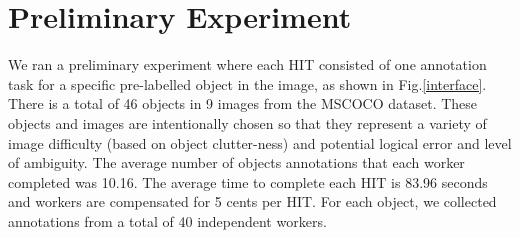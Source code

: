 \documentclass[12pt]{article}
\begin{document}
\section{Preliminary Experiment}
We ran a preliminary experiment where each HIT consisted of one annotation task for a specific pre-labelled object in the image, as shown in Fig.\ref{interface}. There is a total of 46 objects in 9 images from the MSCOCO dataset\cite{Lin2014}. These objects and images are intentionally chosen so that they represent a variety of image difficulty (based on object clutter-ness) and potential logical error and level of ambiguity. The average number of objects annotations that each worker completed was 10.16. The average time to complete each HIT is 83.96 seconds and workers are compensated for 5 cents per HIT.  For each object, we collected annotations from a total of 40 independent workers.
\end{document}
